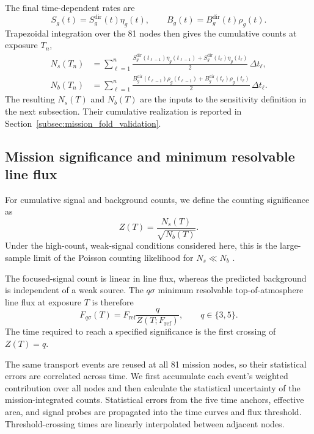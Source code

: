 \documentclass[11pt]{article}
\newcommand{\fref}{F_{\mathrm{ref}}}
\begin{document}
The final time-dependent rates are
\begin{equation}
 S_g(t)=S^{\mathrm{dir}}_g(t)\eta_g(t),\qquad
 B_g(t)=B^{\mathrm{dir}}_g(t)\rho_g(t).
 \label{eq:final_time_rates}
\end{equation}
Trapezoidal integration over the 81 nodes then gives the cumulative counts at
exposure $T_n$,
\begin{equation}
 \begin{aligned}
 N_s(T_n)&=\sum_{\ell=1}^{n}\frac{S^{\mathrm{dir}}_g(t_{\ell-1})\eta_g(t_{\ell-1})+S^{\mathrm{dir}}_g(t_\ell)\eta_g(t_\ell)}{2}\,\Delta t_\ell,\\
 N_b(T_n)&=\sum_{\ell=1}^{n}\frac{B^{\mathrm{dir}}_g(t_{\ell-1})\rho_g(t_{\ell-1})+B^{\mathrm{dir}}_g(t_\ell)\rho_g(t_\ell)}{2}\,\Delta t_\ell.
 \end{aligned}
 \label{eq:cumulative_counts}
\end{equation}
The resulting $N_s(T)$ and $N_b(T)$ are the inputs to the sensitivity definition
in the next subsection. Their cumulative realization is reported in
Section~\ref{subsec:mission_fold_validation}.

\subsection{Mission significance and minimum resolvable line flux}
\label{sec:mission_sensitivity}

For cumulative signal and background counts, we define the counting
significance as
\begin{equation}
 Z(T)=\frac{N_s(T)}{\sqrt{N_b(T)}}.
 \label{eq:mission_significance}
\end{equation}
Under the high-count, weak-signal conditions considered here, this is the
large-sample limit of the Poisson counting likelihood for $N_s\ll N_b$
\cite{Cowan2011}.

The focused-signal count is linear in line flux, whereas the predicted
background is independent of a weak source. The $q\sigma$ minimum resolvable
top-of-atmosphere line flux at exposure $T$ is therefore
\begin{equation}
 F_{q\sigma}(T)=\fref\frac{q}{Z(T;\fref)},
 \qquad q\in\{3,5\}.
 \label{eq:minimum_flux}
\end{equation}
The time required to reach a specified significance is the first crossing of
$Z(T)=q$.

The same transport events are reused at all 81 mission nodes, so their
statistical errors are correlated across time. We first accumulate each event's
weighted contribution over all nodes and then calculate the statistical
uncertainty of the mission-integrated counts. Statistical errors from the five
time anchors, effective area, and signal probes are propagated into the time
curves and flux threshold. Threshold-crossing times are linearly interpolated
between adjacent nodes.
\end{document}
